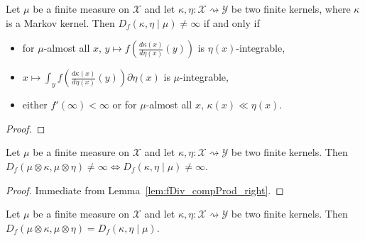 \begin{lemma}
  \label{lem:condFDiv_ne_top_iff}
  \leanok
  Let $\mu$ be a finite measure on $\mathcal X$ and let $\kappa, \eta : \mathcal X \rightsquigarrow \mathcal Y$ be two finite kernels, where $\kappa$ is a Markov kernel.
  Then $D_f(\kappa, \eta \mid \mu) \ne \infty$ if and only if
  \begin{itemize}
    \item for $\mu$-almost all $x$, $y \mapsto f \left( \frac{d\kappa(x)}{d\eta(x)}(y) \right)$ is $\eta(x)$-integrable,
    \item $x \mapsto \int_y f \left( \frac{d\kappa(x)}{d\eta(x)}(y) \right) \partial \eta(x)$ is $\mu$-integrable,
    \item either $f'(\infty) < \infty$ or for $\mu$-almost all $x$, $\kappa(x) \ll \eta(x)$.
  \end{itemize}
\end{lemma}

\begin{proof} \leanok
{}
\end{proof}


\begin{lemma}
  \label{lem:fDiv_compProd_ne_top_iff}
  \leanok
  Let $\mu$ be a finite measure on $\mathcal X$ and let $\kappa, \eta : \mathcal X \rightsquigarrow \mathcal Y$ be two finite kernels.
  Then $D_f(\mu \otimes \kappa, \mu \otimes \eta) \ne \infty \iff D_f(\kappa, \eta \mid \mu) \ne \infty$.
\end{lemma}

\begin{proof} \leanok
{}
Immediate from Lemma~\ref{lem:fDiv_compProd_right}.
\end{proof}


\begin{lemma}
  \label{lem:fDiv_compProd_right}
  \leanok
  Let $\mu$ be a finite measure on $\mathcal X$ and let $\kappa, \eta : \mathcal X \rightsquigarrow \mathcal Y$ be two finite kernels.
  Then $D_f(\mu \otimes \kappa, \mu \otimes \eta) = D_f(\kappa, \eta \mid \mu)$.
\end{lemma}

